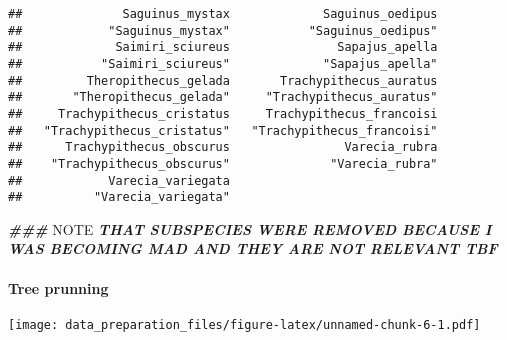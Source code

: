 \documentclass[
]{article}
\newenvironment{Shaded}{\begin{snugshade}}{\end{snugshade}}
\newcommand{\AlertTok}[1]{\textcolor[rgb]{0.94,0.16,0.16}{#1}}
\newcommand{\AttributeTok}[1]{\textcolor[rgb]{0.13,0.29,0.53}{#1}}
\newcommand{\CommentTok}[1]{\textcolor[rgb]{0.56,0.35,0.01}{\textit{#1}}}
\newcommand{\ConstantTok}[1]{\textcolor[rgb]{0.56,0.35,0.01}{#1}}
\newcommand{\DocumentationTok}[1]{\textcolor[rgb]{0.56,0.35,0.01}{\textbf{\textit{#1}}}}
\newcommand{\FunctionTok}[1]{\textcolor[rgb]{0.13,0.29,0.53}{\textbf{#1}}}
\newcommand{\NormalTok}[1]{#1}
\newcommand{\OtherTok}[1]{\textcolor[rgb]{0.56,0.35,0.01}{#1}}
\newcommand{\SpecialCharTok}[1]{\textcolor[rgb]{0.81,0.36,0.00}{\textbf{#1}}}
\newcommand{\StringTok}[1]{\textcolor[rgb]{0.31,0.60,0.02}{#1}}
\begin{document}
\begin{verbatim}
##              Saguinus_mystax             Saguinus_oedipus 
##            "Saguinus_mystax"           "Saguinus_oedipus" 
##             Saimiri_sciureus               Sapajus_apella 
##           "Saimiri_sciureus"             "Sapajus_apella" 
##         Theropithecus_gelada       Trachypithecus_auratus 
##       "Theropithecus_gelada"     "Trachypithecus_auratus" 
##     Trachypithecus_cristatus     Trachypithecus_francoisi 
##   "Trachypithecus_cristatus"   "Trachypithecus_francoisi" 
##      Trachypithecus_obscurus                Varecia_rubra 
##    "Trachypithecus_obscurus"              "Varecia_rubra" 
##            Varecia_variegata 
##          "Varecia_variegata"
\end{verbatim}

\begin{Shaded}
\begin{Highlighting}[]
\DocumentationTok{\#\#\# }\AlertTok{NOTE}\DocumentationTok{ THAT SUBSPECIES WERE REMOVED BECAUSE I WAS BECOMING MAD AND THEY ARE NOT RELEVANT TBF}
\end{Highlighting}
\end{Shaded}

\hypertarget{tree-prunning}{%
\paragraph{Tree prunning}\label{tree-prunning}}

\begin{Shaded}
\end{Shaded}

\texttt{[image: data\_preparation\_files/figure-latex/unnamed-chunk-6-1.pdf]}
\end{document}
